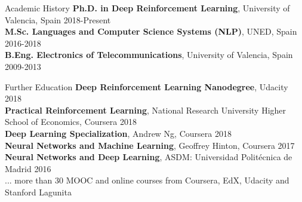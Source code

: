 \documentclass{resume} %
\begin{document}
\begin{rSection}{Academic History}
{\textbf{Ph.D. in Deep Reinforcement Learning}, University of Valencia, Spain} \hfill {2018-Present}
\\
{\textbf{M.Sc. Languages and Computer Science Systems (NLP)}, UNED, Spain} \hfill {2016-2018}
\\
{\textbf{B.Eng. Electronics of Telecommunications}, University of Valencia, Spain} \hfill {2009-2013}
\end{rSection}

\begin{rSection}{Further Education}
{\textbf{Deep Reinforcement Learning Nanodegree}, Udacity} \hfill {2018}\\
{\textbf{Practical Reinforcement Learning}, National Research University Higher School of Economics, Coursera} \hfill {2018}\\
{\textbf{Deep Learning Specialization}, Andrew Ng, Coursera} \hfill {2018}\\
{\textbf{Neural Networks and Machine Learning}, Geoffrey Hinton, Coursera \hfill {2017}}\\
{\textbf{Neural Networks and Deep Learning}, ASDM: Universidad Politécnica de Madrid \hfill {2016}}\\
{... more than 30 MOOC and online courses from Coursera, EdX, Udacity and Stanford Lagunita}
\end{rSection}



\end{document}
